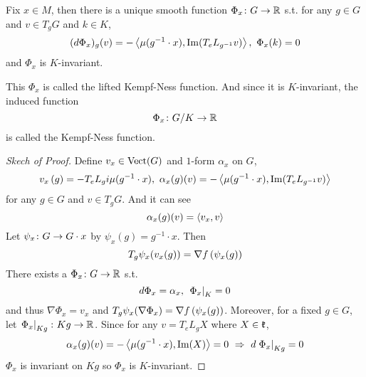 \documentclass[a4paper,12pt]{article}
\begin{document}
	\begin{thm}
		Fix $x \in M$, then there is a unique smooth function $\Phi_x \colon G \rightarrow \mathbb{R}$ s.t. for any $g \in G$ and $v \in T_gG$ and $k \in K$,
		\begin{equation*}
			(d\Phi_x)_g(v) = -\left\langle \mu(g^{-1}\cdot x),\operatorname{Im} (T_eL_{g^{-1}}v) \right\rangle,~\Phi_x(k) = 0
		\end{equation*}
		and $\Phi_x$ is $K$-invariant.
	\end{thm}
	\begin{rem}
		This $\Phi_x$ is called the lifted Kempf-Ness function. And since it is $K$-invariant, the induced function
		\begin{equation*}
			\Phi_x \colon G / K \rightarrow \mathbb{R}
		\end{equation*}
		is called the Kempf-Ness function.
	\end{rem}
	\begin{proof}[Skech of Proof]
		Define $v_x \in \operatorname{Vect}(G)$ and $1$-form $\alpha_x$ on $G$,
		\begin{equation*}
			v_x\left(g\right) = -T_eL_{g}i\mu(g^{-1}\cdot x),~ \alpha_x(g)(v) = -\left\langle \mu(g^{-1}\cdot x),\operatorname{Im} (T_eL_{g^{-1}}v) \right\rangle
		\end{equation*}
		for any $g\in G$ and $v \in T_gG$. And it can see
		\begin{equation*}
			\alpha_x(g)(v) = \left\langle v_x,v \right\rangle
		\end{equation*}
		Let $\psi_x \colon G \rightarrow G \cdot x$ by $\psi_x(g) = g^{-1} \cdot x$. Then
		\begin{equation*}
			T_g\psi_x(v_x(g)) = \nabla f\left(\psi_x(g)\right)
		\end{equation*}
		There exists a $\Phi_x \colon G \rightarrow \mathbb{R}$ s.t.
		\begin{equation*}
			d\Phi_x = \alpha_x,~\left.\Phi_x\right\lvert_K = 0
		\end{equation*}
		and thus $\nabla \Phi_x = v_x$ and $T_g\psi_x(\nabla \Phi_x) = \nabla f\left(\psi_x(g)\right)$. Moreover, for a fixed $g \in G$, let $\left.\Phi_x\right\lvert_{Kg} \colon Kg \rightarrow \mathbb{R}$. Since for any $v = T_eL_g X$ where $X \in \mathfrak{k}$,
		\begin{equation*}
			\alpha_x(g)(v) = -\left\langle \mu(g^{-1}\cdot x),\operatorname{Im} (X) \right\rangle = 0~\Rightarrow~d\left.\Phi_x\right\lvert_{Kg} = 0
		\end{equation*}
		$\Phi_x$ is invariant on $Kg$ so $\Phi_x$ is $K$-invariant.
	\end{proof}
\end{document}

